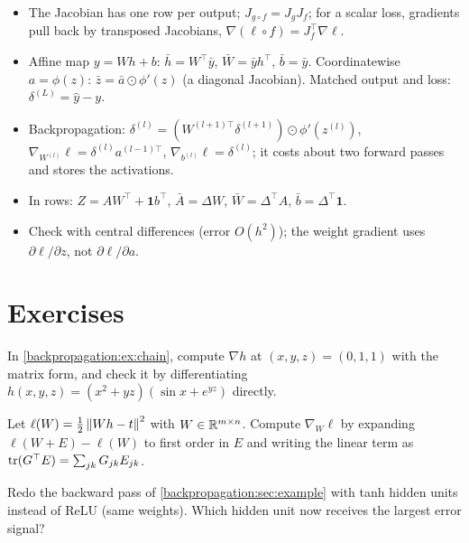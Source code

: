 \begin{notechapter}
\begin{chaptersummary}
\begin{itemize}[nosep]
  \item The Jacobian has one row per output; $J_{g\circ f} = J_gJ_f$; for a scalar loss, gradients pull back by
        transposed Jacobians, $\nabla(\ell\circ f) = J_f^\top\nabla\ell$.
  \item Affine map $y = Wh + b$: $\bar h = W^\top\bar y$, $\bar W = \bar yh^\top$, $\bar b = \bar y$. Coordinatewise $a = \phi(z)$: $\bar z = \bar a\odot\phi'(z)$
        (a diagonal Jacobian). Matched output and loss: $\delta^{(L)} = \hat y - y$.
  \item Backpropagation: $\delta^{(l)} = (W^{(l+1)\top}\delta^{(l+1)})\odot\phi'(z^{(l)})$, $\nabla_{W^{(l)}}\ell = \delta^{(l)}a^{(l-1)\top}$, $\nabla_{b^{(l)}}\ell = \delta^{(l)}$; it costs about two
        forward passes and stores the activations.
  \item In rows: $Z = AW^\top + \mathbf 1b^\top$, $\bar A = \Delta W$, $\bar W = \Delta^\top A$, $\bar b = \Delta^\top\mathbf 1$.
  \item Check with central differences (error $O(h^2)$); the weight gradient uses $\partial\ell/\partial z$, not $\partial\ell/\partial a$.
\end{itemize}
\end{chaptersummary}

\section*{Exercises}

\begin{exercise}\label{backpropagation:exr:1}
In \cref{backpropagation:ex:chain}, compute $\nabla h$ at $(x,y,z) = (0,1,1)$ with the matrix form, and check it by
differentiating $h(x,y,z) = (x^2 + yz)(\sin x + e^{yz})$ directly.
\end{exercise}

\begin{exercise}\label{backpropagation:exr:2}
Let $\ell(W) = \frac12\left\|Wh - t\right\|^2$ with $W\in\mathbb{R}^{m\times n}$. Compute $\nabla_W\ell$ by expanding
$\ell(W + E) - \ell(W)$ to first order in $E$ and writing the linear term as $\operatorname{tr}(G^\top E) = \sum_{jk}G_{jk}E_{jk}$.
\end{exercise}

\begin{exercise}\label{backpropagation:exr:3}
Redo the backward pass of \cref{backpropagation:sec:example} with tanh hidden units instead of ReLU
(same weights). Which hidden unit now receives the largest error signal?
\end{exercise}


\end{notechapter}
